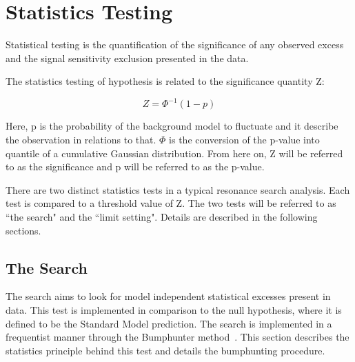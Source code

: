 \section{Statistics Testing}
\label{section:stats}
Statistical testing is the quantification of the significance of any observed excess and the signal sensitivity exclusion presented in the data.

The statistics testing of hypothesis is related to the significance quantity Z:

\begin{equation}
 Z= \Phi^{-1}(1-p) 
 \label{eq:significance}
\end{equation}

Here, p is the probability of the background model to fluctuate and it describe the observation in relations to that. $\Phi$ is the conversion of the p-value into quantile of a cumulative Gaussian distribution. From here on, Z will be referred to as the significance and p will be referred to as the p-value.

There are two distinct statistics tests in a typical resonance search analysis. Each test is compared to a threshold value of Z. The two tests will be referred to as ``the search" and the ``limit setting". Details are described in the following sections.





\subsection{The Search}
\label{sec:thesearch}

The search aims to look for model independent statistical excesses present in data. This test is implemented in comparison to the null hypothesis, where it is defined to be the Standard Model prediction. The search is implemented in a frequentist manner through the Bumphunter method~\cite{choudalakis2011hypothesis}. This section describes the statistics principle behind this test and details the bumphunting procedure. 

